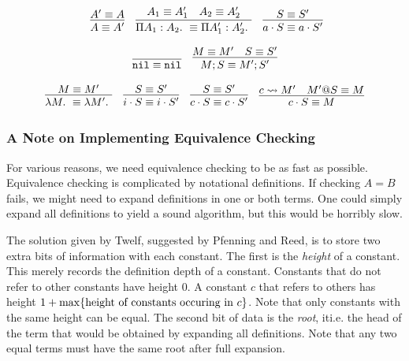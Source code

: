 \documentclass[11pt,twoside]{article}
\begin{document}
\bigskip 
{}
\bigskip 

$$
\begin{array}{lcr}\
\infer{\Equiv{A}{A'}}{\Equiv{A'}{A}} &  
\infer{\Equiv{\PiTyp{A_1}{A_2}}{\PiTyp{A_1'}{A_2'}}}{\Equiv{A_1}{A_1'} & \Equiv{A_2}{A_2'}} & 
\infer{\Equiv{a\cdot S}{a\cdot S'}}{\Equiv{S}{S'}} 
\end{array} 
$$

\bigskip 
{}
\bigskip 

$$
\begin{array}{lcr}
\infer{\Equiv{\Nil}{\Nil}}{} &
\infer{\Equiv{M;S}{M';S'}}{\Equiv{M}{M'} & \Equiv{S}{S'}}
\end{array} 
$$

\bigskip 
{}
\bigskip 

$$
\begin{array}{cccc}
\infer{\Equiv{\Lam{M}}{\Lam{M'}}}{\Equiv{M}{M'}} &
\infer{\Equiv{i\cdot S}{i\cdot S'}}{\Equiv{S}{S'}} &
\infer{\Equiv{c\cdot S}{c\cdot S'}}{\Equiv{S}{S'}} &
\infer{\Equiv{c\cdot S}{M}}{c\StepsTo M' & \Equiv{M'@S}{M}} 
\end{array} 
$$


\subsubsection{A Note on Implementing Equivalence Checking}

  For various reasons, we need equivalence checking to
be as fast as possible.  Equivalence checking is complicated
by notational definitions.  If checking $A=B$ fails, we might need
to expand definitions in one or both terms.  One could simply
expand all definitions to yield a sound algorithm, but this would
be horribly slow.  

  The solution given by Twelf, suggested by 
Pfenning and Reed, is to store two extra bits of information 
with each constant.  The first is the \emph{height} of a constant.
This merely records the definition depth of a constant.  Constants that
do not refer to other constants have height 0.  A constant $c$ that refers
to others has height $1 + \max\{\mbox{height of constants occuring in } c\}$.
Note that only constants with the same height can be equal.  
The second bit of data is the \emph{root}, it{i.e.} the head of the term that would be obtained by 
expanding all definitions.  Note that any two equal terms must have the
same root after full expansion. 
\end{document}
